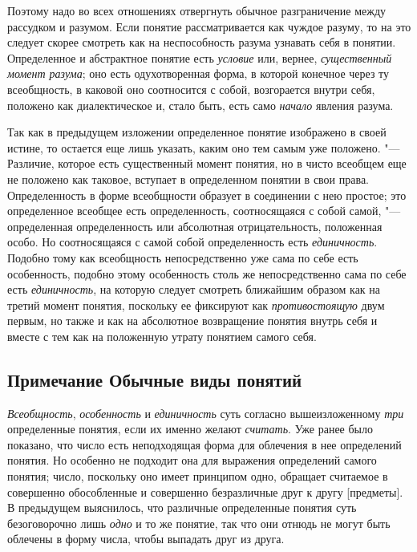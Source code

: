 Поэтому надо во всех отношениях отвергнуть обычное
разграничение между рассудком и разумом. Если понятие рассматривается как
чуждое разуму, то на это следует скорее смотреть как на неспособность
разума узнавать себя в понятии. Определенное и абстрактное понятие есть
{\em условие} или,
вернее, {\em существенный момент
разума}; оно есть одухотворенная форма, в которой конечное
через ту всеобщность, в каковой оно соотносится с собой, возгорается внутри
себя, положено как диалектическое и, стало быть, есть само
{\em начало} явления
разума.

Так как в предыдущем изложении определенное понятие изображено
в своей истине, то остается еще лишь указать, каким оно тем самым уже
положено. "--- Различие, которое есть существенный момент
понятия, но в чисто всеобщем еще не положено как таковое, вступает в
определенном понятии в свои права. Определенность в форме всеобщности
образует в соединении с нею простое; это определенное
всеобщее есть определенность, соотносящаяся с собой самой, "---
определенная определенность или абсолютная отрицательность,
положенная особо. Но соотносящаяся с самой собой определенность есть
{\em единичность}.
Подобно тому как всеобщность непосредственно уже сама по себе
есть особенность, подобно этому особенность столь же непосредственно сама
по себе есть {\em единичность},
на которую следует смотреть ближайшим образом как на третий
момент понятия, поскольку ее фиксируют как
{\em противостоящую} двум
первым, но также и как на абсолютное возвращение понятия внутрь себя и
вместе с тем как на положенную утрату понятием самого себя.

\subsection[Примечание Обычные виды понятий]
{Примечание \newline Обычные виды понятий}

{\em Всеобщность},
{\em особенность} и
{\em единичность} суть
согласно вышеизложенному {\em три}
определенные понятия, если их именно желают
{\em считать}. Уже ранее
было показано, что число есть неподходящая форма для облечения в нее
определений
понятия.
Но особенно не подходит она для выражения определений самого
понятия; число, поскольку оно имеет принципом одно, обращает считаемое в
совершенно обособленные и совершенно безразличные друг к другу [предметы].
В предыдущем выяснилось, что различные определенные понятия суть
безоговорочно лишь {\em одно}
и то же понятие, так что они отнюдь не могут быть облечены в
форму числа, чтобы выпадать друг из друга.


